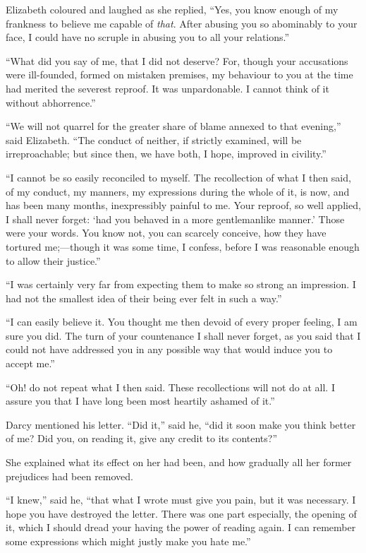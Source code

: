 Elizabeth coloured and laughed as she replied, ``Yes, you know
enough of my frankness to believe me capable of \emph{that}.
After abusing you so abominably to your face, I could have no
scruple in abusing you to all your relations.''

``What did you say of me, that I did not deserve?  For, though
your accusations were ill-founded, formed on mistaken premises,
my behaviour to you at the time had merited the severest
reproof.  It was unpardonable.  I cannot think of it without
abhorrence.''

``We will not quarrel for the greater share of blame annexed to
that evening,'' said Elizabeth.  ``The conduct of neither, if
strictly examined, will be irreproachable; but since then, we
have both, I hope, improved in civility.''

``I cannot be so easily reconciled to myself.  The recollection
of what I then said, of my conduct, my manners, my expressions
during the whole of it, is now, and has been many months,
inexpressibly painful to me.  Your reproof, so well applied, I
shall never forget: `had you behaved in a more gentlemanlike
manner.' Those were your words.  You know not, you can
scarcely conceive, how they have tortured me;---though it was
some time, I confess, before I was reasonable enough to allow
their justice.''

``I was certainly very far from expecting them to make so strong
an impression.  I had not the smallest idea of their being ever
felt in such a way.''

``I can easily believe it.  You thought me then devoid of
every proper feeling, I am sure you did.  The turn of your
countenance I shall never forget, as you said that I could
not have addressed you in any possible way that would induce
you to accept me.''

``Oh! do not repeat what I then said.  These recollections
will not do at all.  I assure you that I have long been most
heartily ashamed of it.''

Darcy mentioned his letter.  ``Did it,'' said he, ``did it soon
make you think better of me?  Did you, on reading it, give any
credit to its contents?''

She explained what its effect on her had been, and how gradually
all her former prejudices had been removed.

``I knew,'' said he, ``that what I wrote must give you pain,
but it was necessary.  I hope you have destroyed the letter.
There was one part especially, the opening of it, which I
should dread your having the power of reading again.  I can
remember some expressions which might justly make you hate me.''

